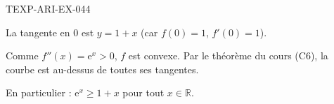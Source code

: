\begin{corrige}{TEXP-ARI-EX-044}

La tangente en $0$ est $y = 1 + x$ (car $f(0)=1$, $f'(0)=1$).


Comme $f''(x) = \mathrm{e}^x > 0$, $f$ est convexe. Par le théorème du cours (C6), la courbe est au-dessus de toutes ses tangentes.

En particulier : $\mathrm{e}^x \geq 1 + x$ pour tout $x \in \mathbb{R}$.

\end{corrige}

